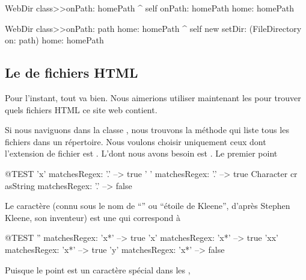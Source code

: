 \documentclass[a4paper,10pt,twoside]{book}
\begin{document}
\begin{code}{}
WebDir class>>onPath: homePath
	^ self onPath: homePath home: homePath

WebDir class>>onPath: path home: homePath
	^ self new setDir: (FileDirectory on: path) home: homePath
\end{code}

\subsection{Le \patmatch de fichiers HTML}

Pour l'instant, tout va bien.
Nous aimerions utiliser maintenant les \expregs{} pour trouver quels
fichiers HTML ce site web contient.

Si nous naviguons dans la classe , nous trouvons la
méthode  qui liste tous les fichiers dans un répertoire.
Nous voulons choisir uniquement ceux dont l'extension de fichier est
. L'\expreg dont nous avons besoin est .
Le premier point 

\begin{code}{@TEST}
'x' matchesRegex: '.' --> true
' ' matchesRegex: '.'  --> true
Character cr asString matchesRegex: '.' --> false
\end{code}

Le caractère \ct{*} (connu sous le nom de ``\ind{\kleenestar}'' ou ``étoile de Kleene'',
d'après Stephen Kleene, son inventeur)
est une \expreg qui correspond à

\begin{code}{@TEST}
'' matchesRegex: 'x*'     --> true
'x' matchesRegex: 'x*'   --> true
'xx' matchesRegex: 'x*' --> true
'y' matchesRegex: 'x*'   --> false
\end{code}

Puisque le point est un caractère spécial dans les \expregs, 
\end{document}
